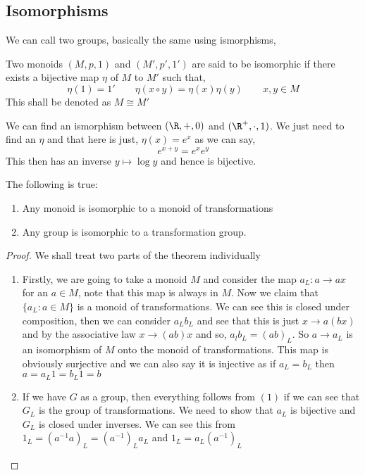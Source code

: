 \subsection{Isomorphisms}
We can call two groups, basically the same using ismorphisms,
\begin{ndefi}[Isomorphism]
  Two monoids $(M, p, 1)$ and $(M', p', 1')$ are said to be isomorphic if there exists a bijective map $\eta$ of $M$ to $M'$ such that,
  $$ \eta(1)=1' \qquad \eta(x\circ y)=\eta(x)\eta(y) \qquad x, y \in M $$
  This shall be denoted as $M \cong M'$
\end{ndefi}

\begin{eg}
  We can find an ismorphism between $(\R, +, 0)$ and $(\R^+, \cdot, 1)$. We just need to find an $\eta$ and that here is just, $\eta(x) = e^x$ as we can say,
  $$ e^{x+y}=e^xe^y $$
  This then has an inverse $y \mapsto \log y$ and hence is bijective.
\end{eg}

\begin{nthm}
  The following is true:
  \begin{enumerate}
    \item Any monoid is isomorphic to a monoid of transformations
    \item Any group is isomorphic to a transformation group.
  \end{enumerate}
\end{nthm}

\begin{proof} We shall treat two parts of the theorem individually
  \begin{enumerate}
    \item Firstly, we are going to take a monoid $M$ and consider the map $a_L : a \to ax$ for an $a \in M$, note that this map is always in $M$. Now we claim that $\{a_L : a \in M\}$ is a monoid of transformations. We can see this is closed under composition, then we can consider $a_Lb_L$ and see that this is just $x \to a (bx)$ and by the associative law $x \to (ab)x$ and so, $a_lb_L = (ab)_L$. So $a \to a_L$ is an isomorphism of $M$ onto the monoid of transformations. This map is obviously surjective and we can also say it is injective as if $a_L = b_L$ then $a = a_L 1 = b_L1 = b$
    \item If we have $G$ as a group, then everything follows from $(1)$ if we can see that $G_L$ is the group of transformations. We need to show that $a_L$ is bijective and $G_L$ is closed under inverses. We can see this from $1_L = (a^{-1}a)_L = (a^{-1})_La_L$ and $1_L = a_L(a^{-1})_L$
  \end{enumerate}
\end{proof}

